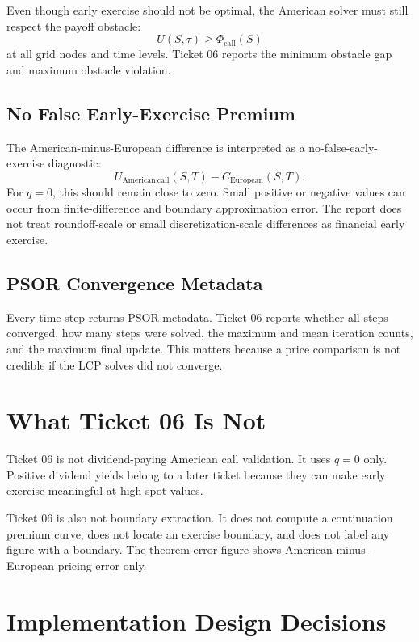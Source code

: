 \documentclass[11pt,a4paper]{article}
\begin{document}
Even though early exercise should not be optimal, the American solver must still respect the
payoff obstacle:
\begin{equation}
  U(S,\tau) \geq \Phi_{\mathrm{call}}(S)
\end{equation}
at all grid nodes and time levels. Ticket 06 reports the minimum obstacle gap and maximum
obstacle violation.

\subsection{No False Early-Exercise Premium}

The American-minus-European difference is interpreted as a no-false-early-exercise diagnostic:
\begin{equation}
  U_{\mathrm{American\ call}}(S,T) - C_{\mathrm{European}}(S,T).
\end{equation}
For \(q=0\), this should remain close to zero. Small positive or negative values can occur from
finite-difference and boundary approximation error. The report does not treat roundoff-scale or
small discretization-scale differences as financial early exercise.

\subsection{PSOR Convergence Metadata}

Every time step returns PSOR metadata. Ticket 06 reports whether all steps converged, how many
steps were solved, the maximum and mean iteration counts, and the maximum final update. This
matters because a price comparison is not credible if the LCP solves did not converge.

\section{What Ticket 06 Is Not}

Ticket 06 is not dividend-paying American call validation. It uses \(q=0\) only. Positive
dividend yields belong to a later ticket because they can make early exercise meaningful at high
spot values.

Ticket 06 is also not boundary extraction. It does not compute a continuation premium curve, does
not locate an exercise boundary, and does not label any figure with a boundary. The theorem-error
figure shows American-minus-European pricing error only.

\section{Implementation Design Decisions}
\end{document}

